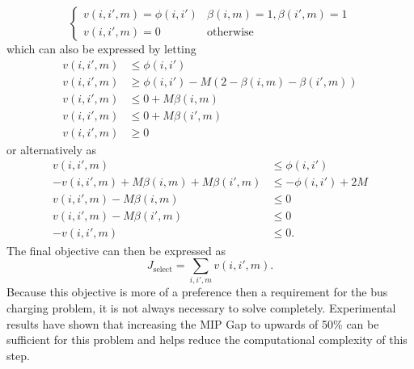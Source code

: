 \begin{equation*}
	\begin{cases}
		v(i,i',m) = \phi(i,i') & \beta(i,m) = 1, \beta(i',m) = 1 \\
		v(i,i',m) = 0 & \text{otherwise}
	\end{cases}
\end{equation*}
which can also be expressed by letting
\begin{equation*}\begin{aligned}
	v(i,i',m) &\le \phi(i,i') \\
	v(i,i',m) &\ge \phi(i,i') - M\left (2 - \beta(i,m) - \beta(i',m)\right ) \\
	v(i,i',m) &\le 0 + M\beta(i,m) \\
	v(i,i',m) &\le 0 + M\beta(i',m) \\
	v(i,i',m) &\ge 0  
\end{aligned}\end{equation*}
or alternatively as
\begin{equation}\begin{aligned}
	v(i,i',m) &\le \phi(i,i') \\
	-v(i,i',m) + M\beta(i,m) + M\beta(i',m)&\le -\phi(i,i') + 2M \\
	v(i,i',m) - M\beta(i,m)  &\le 0 \\
	v(i,i',m) - M\beta(i',m) &\le 0\\
	-v(i,i',m) &\le 0.
\end{aligned}\end{equation}
The final objective can then be expressed as
\begin{equation}
	J_{\text{select}} = \sum_{i,i',m} v(i,i',m).
\end{equation}
Because this objective is more of a preference then a requirement for the bus charging problem, it is not always necessary to solve completely.  Experimental results have shown that increasing the MIP Gap to upwards of 50\% can be sufficient for this problem and helps reduce the computational complexity of this step.
